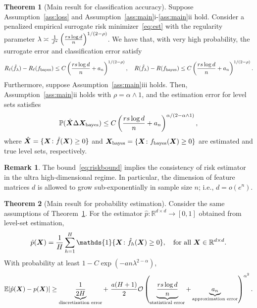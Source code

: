\documentclass[11pt]{article}
\theoremstyle{definition}
\newtheorem{thm}{Theorem}
\newtheorem{rmk}{Remark}
\newcommand*{\KeepStyleUnderBrace}[1]{%
  \mathop{%
    \mathchoice
    {\underbrace{\displaystyle#1}}%
    {\underbrace{\textstyle#1}}%
    {\underbrace{\scriptstyle#1}}%
    {\underbrace{\scriptscriptstyle#1}}%
  }\limits
}
\def\bayesf{f_{\textup{bayes}}}
\begin{document}
\begin{thm}[Main result for classification accuracy]\label{thm:main}
Suppose Assumption~\ref{ass:loss} and Assumption~\ref{ass:main}i-\ref{ass:main}ii hold. 
Consider a penalized empirical surrogate risk minimizer~\eqref{eq:est} with the regularity parameter $\lambda \asymp {1\over J^*}\left({rs\log d\over n}\right)^{1/(2-\rho)}$. We have that, with very high probability,
the surrogate error and classification error satisfy
\begin{equation}\label{eq:riskbound}
R_\ell(\hat f_\lambda) - R_\ell(\bayesf) \leq C\left({rs\log d \over n}+a_n\right)^{1/( 2-\rho)},\quad R(\hat f_\lambda) - R(\bayesf) \leq C\left({rs\log d \over n}+a_n\right)^{1/( 2-\rho)}.
\end{equation}
Furthermore, suppose Assumption~\ref{ass:main}iii holds. Then, Assumption~\ref{ass:main}ii holds with $\rho=\alpha\wedge 1$, and the estimation error for level sets satisfies
\[
\mathbb{P}(\hat {\bm X}\Delta\bm X_{\text{bayes}}) \leq C\left({rs\log d \over n}+a_n\right)^{\alpha/(2-\alpha\wedge 1)},
\]
where $\hat {\bm X}=\{\bm X\colon \hat f(\bm X)\geq 0\}$ and $\mX_{\text{bayes}}=\{\mX\colon \bayesf(\mX)\geq 0\}$ are estimated and true level sets, respectively. 
\end{thm}
\begin{rmk} The bound~\eqref{eq:riskbound} implies the consistency of risk estimator in the ultra high-dimensional regime. In particular, the dimension of feature matrices $d$ is allowed to grow sub-exponentially in sample size $n$; i.e., $d=o(e^n)$.
\end{rmk}

\begin{thm}[Main result for probability estimation] Consider the same assumptions of Theorem~\ref{thm:main}. For the estimator $\hat p\colon \mathbb{R}^{d\times d}\to[0,1]$ obtained from level-set estimation,
\[
\hat p(\mX)={1\over H}\sum_{h=1}^H \mathds{1}\{\mX\colon \hat f_h(\mX)\geq 0\},\quad \text{for all }\mX\in\mathbb{R}^{d\times d}.
\]
With probability at least $1-C\exp(-an\lambda^{2-\alpha})$,
\[
\mathbb{E}|\hat p(\mX)- p(\mX)| \geq \KeepStyleUnderBrace{{1\over 2H}}_{\text{discretization error}} +\ {a(H+1)\over 2} \tO\left(\KeepStyleUnderBrace{{rs\log d\over n}}_{\text{statistical error}} +\KeepStyleUnderBrace{a_n}_{\text{approximation error}}\right)^{\alpha^2}.
\]
\end{thm}
\end{document}
